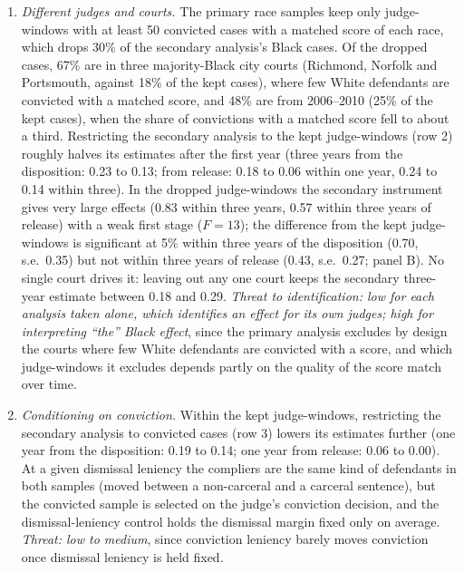 \documentclass[11pt]{article}
\begin{document}
\begin{enumerate}
  \item \emph{Different judges and courts.} The primary race samples keep only judge-windows with at least 50 convicted cases with a matched score of each race, which drops 30\% of the secondary analysis's Black cases. Of the dropped cases, 67\% are in three majority-Black city courts (Richmond, Norfolk and Portsmouth, against 18\% of the kept cases), where few White defendants are convicted with a matched score, and 48\% are from 2006--2010 (25\% of the kept cases), when the share of convictions with a matched score fell to about a third. Restricting the secondary analysis to the kept judge-windows (row 2) roughly halves its estimates after the first year (three years from the disposition: 0.23 to 0.13; from release: 0.18 to 0.06 within one year, 0.24 to 0.14 within three). In the dropped judge-windows the secondary instrument gives very large effects (0.83 within three years, 0.57 within three years of release) with a weak first stage ($F = 13$); the difference from the kept judge-windows is significant at 5\% within three years of the disposition (0.70, s.e.\ 0.35) but not within three years of release (0.43, s.e.\ 0.27; panel B). No single court drives it: leaving out any one court keeps the secondary three-year estimate between 0.18 and 0.29. \emph{Threat to identification: low for each analysis taken alone, which identifies an effect for its own judges; high for interpreting ``the'' Black effect}, since the primary analysis excludes by design the courts where few White defendants are convicted with a score, and which judge-windows it excludes depends partly on the quality of the score match over time.
  \item \emph{Conditioning on conviction.} Within the kept judge-windows, restricting the secondary analysis to convicted cases (row 3) lowers its estimates further (one year from the disposition: 0.19 to 0.14; one year from release: 0.06 to 0.00). At a given dismissal leniency the compliers are the same kind of defendants in both samples (moved between a non-carceral and a carceral sentence), but the convicted sample is selected on the judge's conviction decision, and the dismissal-leniency control holds the dismissal margin fixed only on average. \emph{Threat: low to medium}, since conviction leniency barely moves conviction once dismissal leniency is held fixed.

\end{enumerate}
\end{document}
